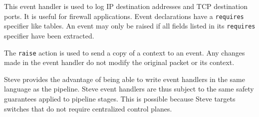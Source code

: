 This event handler is used to log IP destination addresses and
TCP destination ports. It is useful for firewall applications.
Event declarations have a \texttt{requires} specifier
like tables. An event may only be raised if all fields listed in its
\texttt{requires} specifier have been extracted.

The \texttt{raise} action is used to send a copy of a context to an event.
Any changes made in the event handler do not modify the
original packet or its context.

Steve provides the advantage of being able to write event handlers
in the same language as the pipeline. 
Steve event handlers are thus subject to the same safety
guarantees applied to pipeline stages.
This is possible because Steve targets switches that do not require
centralized control planes.

%


